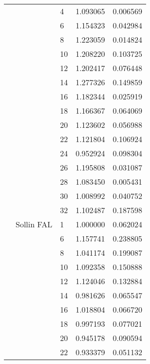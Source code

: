 \begin{tabular}{lllrr}
                      &            & 4  &  1.093065 &  0.006569 \\
                      &            & 6  &  1.154323 &  0.042984 \\
                      &            & 8  &  1.223059 &  0.014824 \\
                      &            & 10 &  1.208220 &  0.103725 \\
                      &            & 12 &  1.202417 &  0.076448 \\
                      &            & 14 &  1.277326 &  0.149859 \\
                      &            & 16 &  1.182344 &  0.025919 \\
                      &            & 18 &  1.166367 &  0.064069 \\
                      &            & 20 &  1.123602 &  0.056988 \\
                      &            & 22 &  1.121804 &  0.106924 \\
                      &            & 24 &  0.952924 &  0.098304 \\
                      &            & 26 &  1.195808 &  0.031087 \\
                      &            & 28 &  1.083450 &  0.005431 \\
                      &            & 30 &  1.008992 &  0.040752 \\
                      &            & 32 &  1.102487 &  0.187598 \\
                      & Sollin FAL & 1  &  1.000000 &  0.062024 \\
                      &            & 6  &  1.157741 &  0.238805 \\
                      &            & 8  &  1.041174 &  0.199087 \\
                      &            & 10 &  1.092358 &  0.150888 \\
                      &            & 12 &  1.124046 &  0.132884 \\
                      &            & 14 &  0.981626 &  0.065547 \\
                      &            & 16 &  1.018804 &  0.066720 \\
                      &            & 18 &  0.997193 &  0.077021 \\
                      &            & 20 &  0.945178 &  0.090594 \\
                      &            & 22 &  0.933379 &  0.051132 \\

\end{tabular}
